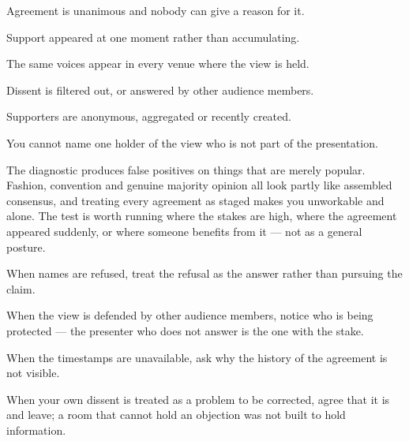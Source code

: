 \begin{feedback}
  \item Agreement is unanimous and nobody can give a reason for it.
  \item Support appeared at one moment rather than accumulating.
  \item The same voices appear in every venue where the view is held.
  \item Dissent is filtered out, or answered by other audience members.
  \item Supporters are anonymous, aggregated or recently created.
  \item You cannot name one holder of the view who is not part of the presentation.
\end{feedback}

\begin{failure}
The diagnostic produces false positives on things that are merely popular. Fashion, convention and genuine majority opinion all look partly like assembled consensus, and treating every agreement as staged makes you unworkable and alone. The test is worth running where the stakes are high, where the agreement appeared suddenly, or where someone benefits from it --- not as a general posture.
\end{failure}

\begin{countermeasures}
  \item When names are refused, treat the refusal as the answer rather than pursuing the claim.
  \item When the view is defended by other audience members, notice who is being protected --- the presenter who does not answer is the one with the stake.
  \item When the timestamps are unavailable, ask why the history of the agreement is not visible.
  \item When your own dissent is treated as a problem to be corrected, agree that it is and leave; a room that cannot hold an objection was not built to hold information.
\end{countermeasures}

\seesources
{}
